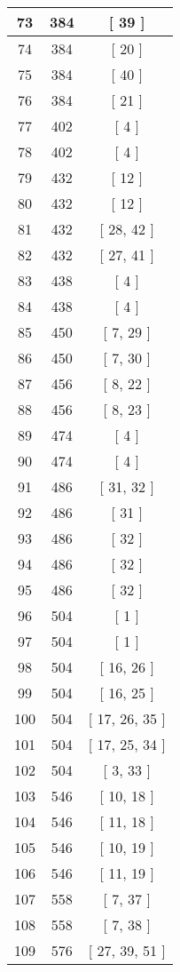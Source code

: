 \begin{center}
\begin{longtable}[H]{|| c c c ||}
\hline
73 & 384 & [ 39 ] \\ 
\hline
74 & 384 & [ 20 ] \\ 
\hline
75 & 384 & [ 40 ] \\ 
\hline
76 & 384 & [ 21 ] \\ 
\hline
77 & 402 & [ 4 ] \\ 
\hline
78 & 402 & [ 4 ] \\ 
\hline
79 & 432 & [ 12 ] \\ 
\hline
80 & 432 & [ 12 ] \\ 
\hline
81 & 432 & [ 28, 42 ] \\ 
\hline
82 & 432 & [ 27, 41 ] \\ 
\hline
83 & 438 & [ 4 ] \\ 
\hline
84 & 438 & [ 4 ] \\ 
\hline
85 & 450 & [ 7, 29 ] \\ 
\hline
86 & 450 & [ 7, 30 ] \\ 
\hline
87 & 456 & [ 8, 22 ] \\ 
\hline
88 & 456 & [ 8, 23 ] \\ 
\hline
89 & 474 & [ 4 ] \\ 
\hline
90 & 474 & [ 4 ] \\ 
\hline
91 & 486 & [ 31, 32 ] \\ 
\hline
92 & 486 & [ 31 ] \\ 
\hline
93 & 486 & [ 32 ] \\ 
\hline
94 & 486 & [ 32 ] \\ 
\hline
95 & 486 & [ 32 ] \\ 
\hline
96 & 504 & [ 1 ] \\ 
\hline
97 & 504 & [ 1 ] \\ 
\hline
98 & 504 & [ 16, 26 ] \\ 
\hline
99 & 504 & [ 16, 25 ] \\ 
\hline
100 & 504 & [ 17, 26, 35 ] \\ 
\hline
101 & 504 & [ 17, 25, 34 ] \\ 
\hline
102 & 504 & [ 3, 33 ] \\ 
\hline
103 & 546 & [ 10, 18 ] \\ 
\hline
104 & 546 & [ 11, 18 ] \\ 
\hline
105 & 546 & [ 10, 19 ] \\ 
\hline
106 & 546 & [ 11, 19 ] \\ 
\hline
107 & 558 & [ 7, 37 ] \\ 
\hline
108 & 558 & [ 7, 38 ] \\ 
\hline
109 & 576 & [ 27, 39, 51 ] \\ 

\end{longtable}
\end{center}
